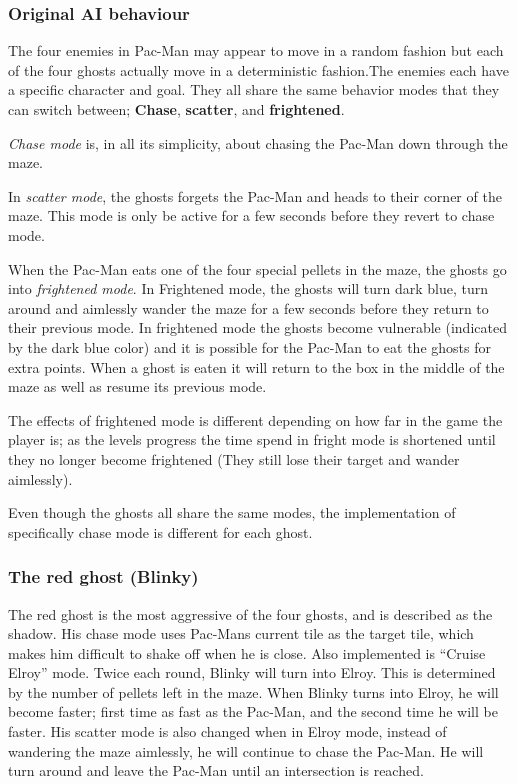 \subsubsection{Original AI behaviour}
The four enemies in Pac-Man may appear to move in a random fashion but each of the four ghosts actually move in a deterministic fashion.The enemies each have a specific character and goal. They all share the same behavior modes that they can switch between; \textbf{Chase}, \textbf{scatter}, and \textbf{frightened}.

\emph{Chase mode} is, in all its simplicity, about chasing the Pac-Man down through the maze.

In \emph{scatter mode}, the ghosts forgets the Pac-Man and heads to their corner of the maze. This mode is only be active for a few seconds before they revert to chase mode.

When the Pac-Man eats one of the four special pellets in the maze, the ghosts go into \emph{frightened mode}. In Frightened mode, the ghosts will turn dark blue, turn around and aimlessly wander the maze for a few seconds before they return to their previous mode. In frightened mode the ghosts become vulnerable (indicated by the dark blue color) and it is possible for the Pac-Man to eat the ghosts for extra points. When a ghost is eaten it will return to the box in the middle of the maze as well as resume its previous mode.

The effects of frightened mode is different depending on how far in the game the player is; as the levels progress the time spend in fright mode is shortened until they no longer become frightened (They still lose their target and wander aimlessly).


Even though the ghosts all share the same modes, the implementation of specifically chase mode is different for each ghost.

\subsubsection*{The red ghost (Blinky)}
The red ghost is the most aggressive of the four ghosts, and is described as the shadow. His chase mode uses Pac-Mans current tile as the target tile, which makes him difficult to shake off when he is close. Also implemented is “Cruise Elroy” mode. Twice each round, Blinky will turn into Elroy. This is determined by the number of pellets left in the maze. When Blinky turns into Elroy, he will become faster; first time as fast as the Pac-Man, and the second time he will be faster. His scatter mode is also changed when in Elroy mode, instead of wandering the maze aimlessly, he will continue to chase the Pac-Man. He will turn around and leave the Pac-Man until an intersection is reached.


